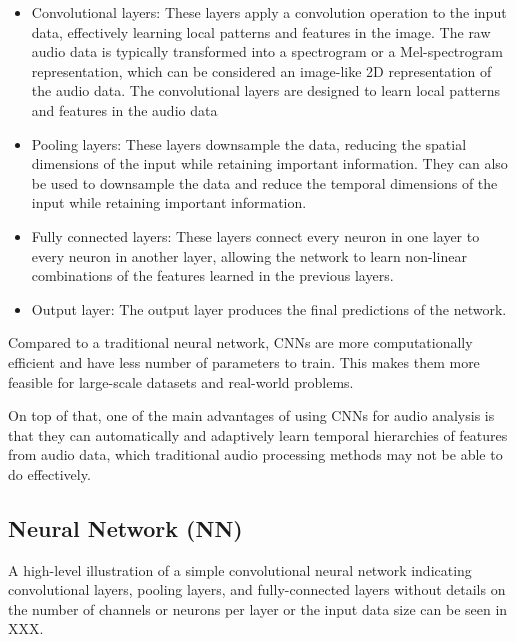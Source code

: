 \begin{itemize}

\item Convolutional layers: These layers apply a convolution operation to the input data, effectively learning local patterns and features in the image. The raw audio data is typically transformed into a spectrogram or a Mel-spectrogram representation, which can be considered an image-like 2D representation of the audio data. The convolutional layers are designed to learn local patterns and features in the audio data
\vspace*{3mm}

\item Pooling layers: These layers downsample the data, reducing the spatial dimensions of the input while retaining important information. They can also be used to downsample the data and reduce the temporal dimensions of the input while retaining important information. 
\vspace*{3mm}

\item Fully connected layers: These layers connect every neuron in one layer to every neuron in another layer, allowing the network to learn non-linear combinations of the features learned in the previous layers.
\vspace*{3mm}

\item Output layer: The output layer produces the final predictions of the network.
\end{itemize}

Compared to a traditional neural network, CNNs are more computationally efficient and have less number of parameters to train. This makes them more feasible for large-scale datasets and real-world problems.

On top of that, one of the main advantages of using CNNs for audio analysis is that they can automatically and adaptively learn temporal hierarchies of features from audio data, which traditional audio processing methods may not be able to do effectively. 

\subsection{Neural Network (NN)}






A high-level illustration of a simple convolutional neural network indicating convolutional layers, pooling layers, and fully-connected layers without details on the number of channels or neurons per layer or the input data size can be seen in XXX.








\newpage


